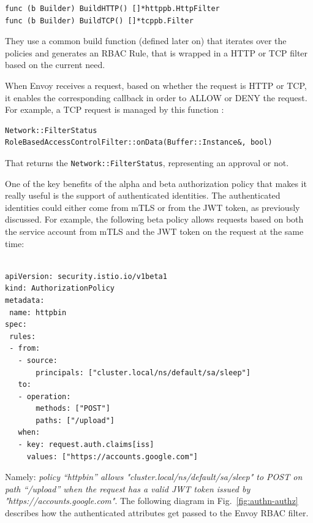 \begin{lstlisting}[title=\href{https://github.com/istio/istio/blob/4e6e7f49375d84bb35ee614c6b7d38b6c2fd3e7b/pilot/pkg/security/authz/builder/builder.go\#L62-L92}{GitHub permalink}]
func (b Builder) BuildHTTP() []*httppb.HttpFilter
func (b Builder) BuildTCP() []*tcppb.Filter
\end{lstlisting}

\noindent They use a common build function (defined later on) that iterates over the policies and generates an RBAC Rule, that is wrapped in a HTTP or TCP filter based on the current need.

When Envoy receives a request, based on whether the request is HTTP or TCP, it enables the corresponding callback in order to ALLOW or DENY the request. For example, a TCP request is managed by this function \cite{envoycode}:

\begin{lstlisting}[title=\href{https://github.com/envoyproxy/envoy/blob/e9207f4f5e93fcec603cf4949763829010836ae2/source/extensions/filters/network/rbac/rbac_filter.cc\#L22-L63}{GitHub permalink}]
Network::FilterStatus RoleBasedAccessControlFilter::onData(Buffer::Instance&, bool)
\end{lstlisting}

That returns the \texttt{Network::FilterStatus}, representing an approval or not.

One of the key benefits of the alpha and beta authorization policy that makes it really useful is the support of authenticated identities. The authenticated identities could either come from mTLS or from the JWT token, as previously discussed.
For example, the following beta policy allows requests based on both the service account from mTLS and the JWT token on the request at the same time:

\begin{lstlisting}

apiVersion: security.istio.io/v1beta1
kind: AuthorizationPolicy
metadata:
 name: httpbin
spec:
 rules:
 - from:
   - source:
       principals: ["cluster.local/ns/default/sa/sleep"]
   to:
   - operation:
       methods: ["POST"]
       paths: ["/upload"]
   when:
   - key: request.auth.claims[iss]
     values: ["https://accounts.google.com"]

\end{lstlisting}

\noindent Namely: \textit{policy “httpbin” allows "cluster.local/ns/default/sa/sleep" to POST on path “/upload” when the request has a valid JWT token issued by "https://accounts.google.com"}. The following diagram in Fig.~\ref{fig:authn-authz} describes how the authenticated attributes get passed to the Envoy RBAC filter.

